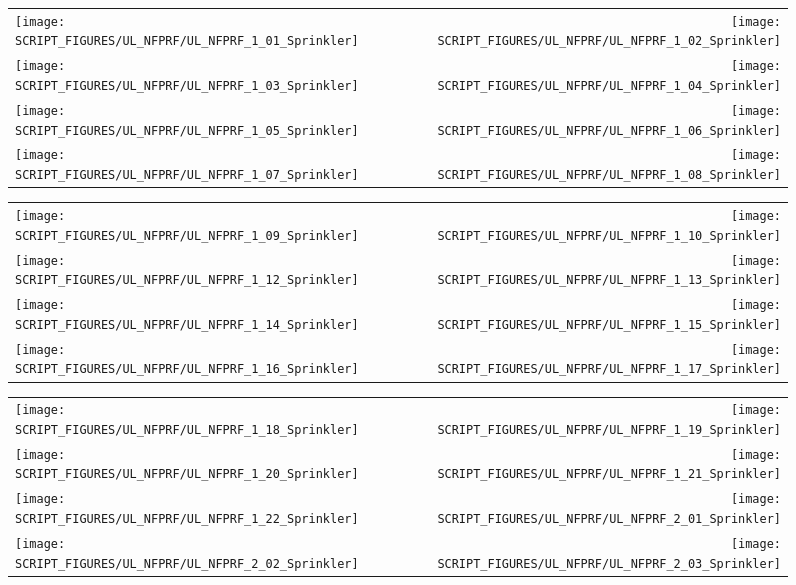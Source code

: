 \begin{figure}[p]
\begin{tabular*}{\textwidth}{l@{\extracolsep{\fill}}r}
\texttt{[image: SCRIPT\_FIGURES/UL\_NFPRF/UL\_NFPRF\_1\_01\_Sprinkler]} &
\texttt{[image: SCRIPT\_FIGURES/UL\_NFPRF/UL\_NFPRF\_1\_02\_Sprinkler]} \\
\texttt{[image: SCRIPT\_FIGURES/UL\_NFPRF/UL\_NFPRF\_1\_03\_Sprinkler]} &
\texttt{[image: SCRIPT\_FIGURES/UL\_NFPRF/UL\_NFPRF\_1\_04\_Sprinkler]} \\
\texttt{[image: SCRIPT\_FIGURES/UL\_NFPRF/UL\_NFPRF\_1\_05\_Sprinkler]} &
\texttt{[image: SCRIPT\_FIGURES/UL\_NFPRF/UL\_NFPRF\_1\_06\_Sprinkler]} \\
\texttt{[image: SCRIPT\_FIGURES/UL\_NFPRF/UL\_NFPRF\_1\_07\_Sprinkler]} &
\texttt{[image: SCRIPT\_FIGURES/UL\_NFPRF/UL\_NFPRF\_1\_08\_Sprinkler]}
\end{tabular*}
\end{figure}

\begin{figure}[p]
\begin{tabular*}{\textwidth}{l@{\extracolsep{\fill}}r}
\texttt{[image: SCRIPT\_FIGURES/UL\_NFPRF/UL\_NFPRF\_1\_09\_Sprinkler]} &
\texttt{[image: SCRIPT\_FIGURES/UL\_NFPRF/UL\_NFPRF\_1\_10\_Sprinkler]} \\
\texttt{[image: SCRIPT\_FIGURES/UL\_NFPRF/UL\_NFPRF\_1\_12\_Sprinkler]} &
\texttt{[image: SCRIPT\_FIGURES/UL\_NFPRF/UL\_NFPRF\_1\_13\_Sprinkler]} \\
\texttt{[image: SCRIPT\_FIGURES/UL\_NFPRF/UL\_NFPRF\_1\_14\_Sprinkler]} &
\texttt{[image: SCRIPT\_FIGURES/UL\_NFPRF/UL\_NFPRF\_1\_15\_Sprinkler]} \\
\texttt{[image: SCRIPT\_FIGURES/UL\_NFPRF/UL\_NFPRF\_1\_16\_Sprinkler]} &
\texttt{[image: SCRIPT\_FIGURES/UL\_NFPRF/UL\_NFPRF\_1\_17\_Sprinkler]}
\end{tabular*}
\end{figure}

\begin{figure}[p]
\begin{tabular*}{\textwidth}{l@{\extracolsep{\fill}}r}
\texttt{[image: SCRIPT\_FIGURES/UL\_NFPRF/UL\_NFPRF\_1\_18\_Sprinkler]} &
\texttt{[image: SCRIPT\_FIGURES/UL\_NFPRF/UL\_NFPRF\_1\_19\_Sprinkler]} \\
\texttt{[image: SCRIPT\_FIGURES/UL\_NFPRF/UL\_NFPRF\_1\_20\_Sprinkler]} &
\texttt{[image: SCRIPT\_FIGURES/UL\_NFPRF/UL\_NFPRF\_1\_21\_Sprinkler]} \\
\texttt{[image: SCRIPT\_FIGURES/UL\_NFPRF/UL\_NFPRF\_1\_22\_Sprinkler]} &
\texttt{[image: SCRIPT\_FIGURES/UL\_NFPRF/UL\_NFPRF\_2\_01\_Sprinkler]} \\
\texttt{[image: SCRIPT\_FIGURES/UL\_NFPRF/UL\_NFPRF\_2\_02\_Sprinkler]} &
\texttt{[image: SCRIPT\_FIGURES/UL\_NFPRF/UL\_NFPRF\_2\_03\_Sprinkler]}
\end{tabular*}
\end{figure}

